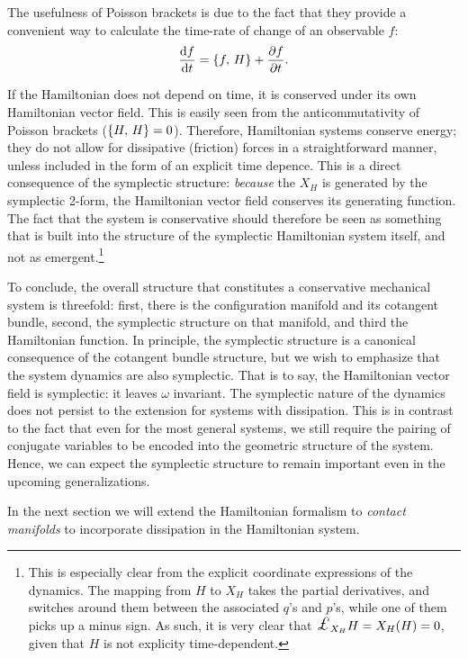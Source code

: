 The usefulness of Poisson brackets is due to the fact that they provide a convenient way to calculate the time-rate of change of an observable $f$: 
$$
    \dv{f}{t} = \qty{f,\,H} + \pdv{f}{t}.
$$

If the Hamiltonian does not depend on time, it is conserved under its own Hamiltonian vector field. This is easily seen from the anticommutativity of Poisson brackets ($\qty{H,\,H} = 0$). Therefore, Hamiltonian systems conserve energy; they do not allow for dissipative (friction) forces in a straightforward manner, unless included in the form of an explicit time depence. This is a direct consequence of the symplectic structure: \emph{because} the $X_H$ is generated by the symplectic 2-form, the Hamiltonian vector field conserves its generating function. The fact that the system is conservative should therefore be seen as something that is built into the structure of the symplectic Hamiltonian system itself, and not as emergent.\footnote{This is especially clear from the explicit coordinate expressions of the dynamics. The mapping from $H$ to $X_H$ takes the partial derivatives, and switches around them between the associated $q$'s and $p$'s, while one of them picks up a minus sign. As such, it is very clear that $\lied{X_H}{H} = X_H(H) = 0$, given that $H$ is not explicity time-dependent.}

To conclude, the overall structure that constitutes a conservative mechanical system is threefold: first, there is the configuration manifold and its cotangent bundle, second, the symplectic structure on that manifold, and third the Hamiltonian function. In principle, the symplectic structure is a canonical consequence of the cotangent bundle structure, but we wish to emphasize that the system dynamics are also symplectic. That is to say, the Hamiltonian vector field is symplectic: it leaves $\omega$ invariant. The symplectic nature of the dynamics does not persist to the extension for systems with dissipation. This is in contrast to the fact that even for the most general systems, we still require the pairing of conjugate variables to be encoded into the geometric structure of the system. Hence, we can expect the symplectic structure to remain important even in the upcoming generalizations.

In the next section we will extend the Hamiltonian formalism to \emph{contact manifolds} to incorporate dissipation in the Hamiltonian system.
